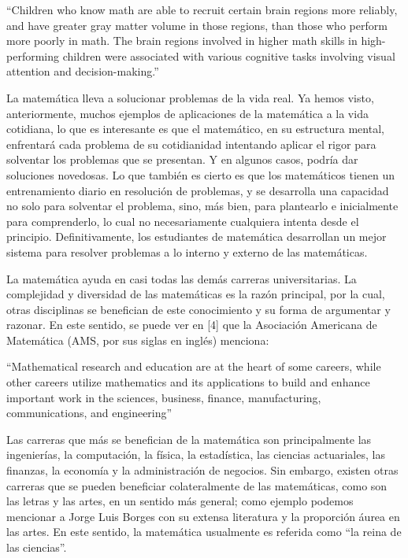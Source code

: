     “Children who know math are able to recruit certain brain regions more reliably, and have greater gray matter volume in those regions, than those who perform more poorly in math. The brain regions involved in higher math skills in high-performing children were associated with various cognitive tasks involving visual attention and decision-making.” 

La matemática lleva a solucionar problemas de la vida real. Ya hemos visto, anteriormente, muchos ejemplos de aplicaciones de la matemática a la vida cotidiana, lo que es interesante es que el matemático, en su estructura mental, enfrentará cada problema de su cotidianidad intentando aplicar el rigor para solventar los problemas que se presentan. Y en algunos casos, podría dar soluciones novedosas. Lo que también es cierto es que los matemáticos tienen un entrenamiento diario en resolución de problemas, y se desarrolla una capacidad no solo para solventar el problema, sino, más bien, para plantearlo e inicialmente para comprenderlo, lo cual no necesariamente cualquiera intenta desde el principio. Definitivamente, los estudiantes de matemática desarrollan un mejor sistema para resolver problemas a lo interno y externo de las matemáticas.

La matemática ayuda en casi todas las demás carreras universitarias.  La complejidad y diversidad de las matemáticas es la razón principal, por la cual, otras disciplinas se benefician de este conocimiento y su forma de argumentar y razonar.  En este sentido, se puede ver en [4] que la Asociación Americana de Matemática (AMS, por sus siglas en inglés) menciona: 

    “Mathematical research and education are at the heart of some careers, while other careers utilize mathematics and its applications to build and enhance important work in the sciences, business, finance, manufacturing, communications, and engineering”

Las carreras que más se benefician de la matemática son principalmente las ingenierías, la computación, la física, la estadística, las ciencias actuariales, las finanzas, la economía y la administración de negocios. Sin embargo, existen otras carreras que se pueden beneficiar colateralmente de las matemáticas, como son las letras y las artes, en un sentido más general; como ejemplo podemos mencionar a Jorge Luis Borges con su extensa literatura y la proporción áurea en las artes.  En este sentido, la matemática usualmente es referida como “la reina de las ciencias”.

